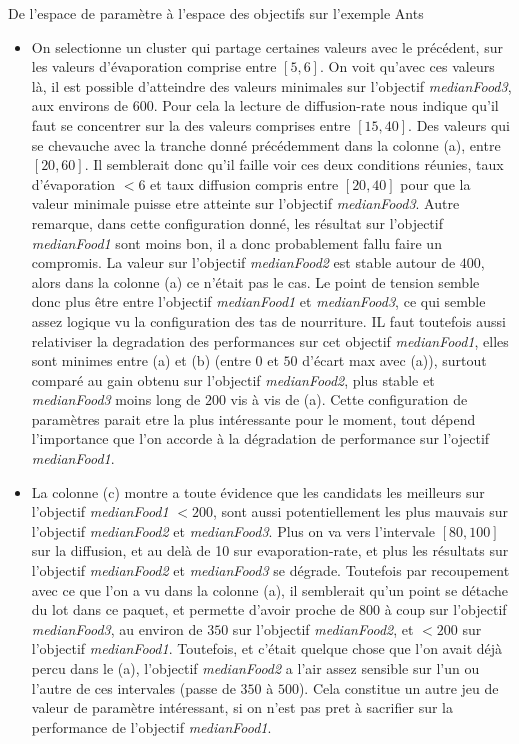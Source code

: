 \begin{framewithtitle}[]{De l'espace de paramètre à l'espace des objectifs sur l'exemple Ants }
\begin{itemize}[noitemsep,nolistsep]
	\item On selectionne un cluster qui partage certaines valeurs avec le précédent, sur les valeurs d'évaporation comprise entre $[5, 6]$. On voit qu'avec ces valeurs là, il est possible d'atteindre des valeurs minimales sur l'objectif \textit{medianFood3}, aux environs de $600$. Pour cela la lecture de diffusion-rate nous indique qu'il faut se concentrer sur la des valeurs comprises entre $[15, 40]$. Des valeurs qui se chevauche avec la tranche donné précédemment dans la colonne (a), entre $[20, 60]$. Il semblerait donc qu'il faille voir ces deux conditions réunies, taux d'évaporation $< 6$ et taux diffusion compris entre $[20, 40]$ pour que la valeur minimale puisse etre atteinte sur l'objectif \textit{medianFood3}. Autre remarque, dans cette configuration donné, les résultat sur l'objectif \textit{medianFood1} sont moins bon, il a donc probablement fallu faire un compromis. La valeur sur l'objectif \textit{medianFood2} est stable autour de $400$, alors dans la colonne (a) ce n'était pas le cas. Le point de tension semble donc plus être entre l'objectif \textit{medianFood1} et \textit{medianFood3}, ce qui semble assez logique vu la configuration des tas de nourriture. IL faut toutefois aussi relativiser la degradation des performances sur cet objectif \textit{medianFood1}, elles sont minimes entre (a) et (b) (entre $0$ et $50$ d'écart max avec (a)), surtout comparé au gain obtenu sur l'objectif \textit{medianFood2}, plus stable et \textit{medianFood3} moins long de $200$ vis à vis de (a). Cette configuration de paramètres parait etre la plus intéressante pour le moment, tout dépend l'importance que l'on accorde à la dégradation de performance sur l'ojectif \textit{medianFood1}.
	\item La colonne (c) montre a toute évidence que les candidats les meilleurs sur l'objectif \textit{medianFood1} $< 200$, sont aussi potentiellement les plus mauvais sur l'objectif \textit{medianFood2} et \textit{medianFood3}. Plus on va vers l'intervale $[80, 100]$ sur la diffusion, et au delà de 10 sur evaporation-rate, et plus les résultats sur l'objectif \textit{medianFood2} et \textit{medianFood3} se dégrade. Toutefois par recoupement avec ce que l'on a vu dans la colonne (a), il semblerait qu'un point se détache du lot dans ce paquet, et permette d'avoir proche de $800$ à coup sur l'objectif \textit{medianFood3}, au environ de $350$ sur l'objectif \textit{medianFood2}, et $ < 200$ sur l'objectif \textit{medianFood1}. Toutefois, et c'était quelque chose que l'on avait déjà percu dans le (a), l'objectif \textit{medianFood2} a l'air assez sensible sur l'un ou l'autre de ces intervales (passe de $350$ à $500$). Cela constitue un autre jeu de valeur de paramètre intéressant, si on n'est pas pret à sacrifier sur la performance de l'objectif \textit{medianFood1}.

\end{itemize}
\end{framewithtitle}
